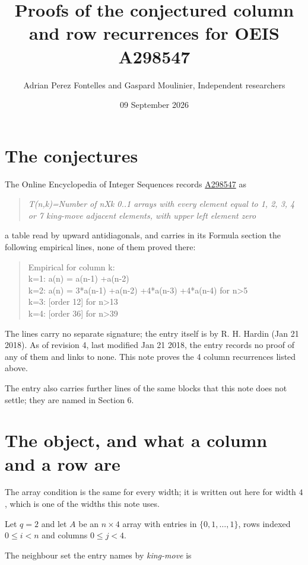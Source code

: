 \documentclass[11pt]{article}
\title{Proofs of the conjectured column and row recurrences for OEIS A298547}
\author{Adrian Perez Fontelles and Gaspard Moulinier, Independent researchers}
\date{09 September 2026}
\theoremstyle{definition}
\begin{document}
\maketitle
\section{The conjectures}

The Online Encyclopedia of Integer Sequences records \href{https://oeis.org/A298547}{A298547} as

\begin{quote}\itshape T(n,k)=Number of nXk 0..1 arrays with every element equal to 1, 2, 3, 4 or 7 king-move adjacent elements, with upper left element zero\end{quote}

a table read by upward antidiagonals, and carries in its Formula section the following empirical lines, none of them proved there:

\begin{quote}\ttfamily Empirical for column k:\\
k=1: a(n) = a(n-1) +a(n-2)\\k=2: a(n) = 3*a(n-1) +a(n-2) +4*a(n-3) +4*a(n-4) for n>5\\k=3: [order 12] for n>13\\k=4: [order 36] for n>39\end{quote}

The lines carry no separate signature; the entry itself is by R. H. Hardin (Jan 21 2018). As of revision 4, last modified Jan 21 2018, the entry records no proof of any of them and links to none. This note proves the 4 column recurrences listed above.

The entry also carries further lines of the same blocks that this note does not settle; they are named in Section 6.

\section{The object, and what a column and a row are}

The array condition is the same for every width; it is written out here for width $4$, which is one of the widths this note uses.

Let $q = 2$ and let $A$ be an $n \times 4$ array with entries in $\{0,1,\dots,1\}$, rows indexed $0 \le i < n$ and columns $0 \le j < 4$.

The neighbour set the entry names by {\itshape king-move} is
\end{document}
